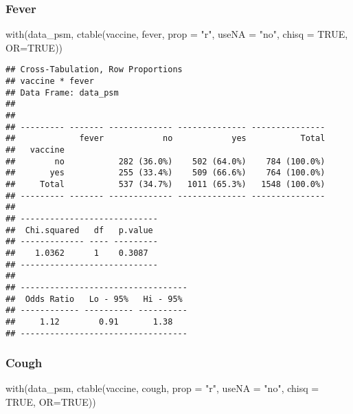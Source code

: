 \documentclass[
]{article}
\newenvironment{Shaded}{\begin{snugshade}}{\end{snugshade}}
\newcommand{\AttributeTok}[1]{\textcolor[rgb]{0.77,0.63,0.00}{#1}}
\newcommand{\ConstantTok}[1]{\textcolor[rgb]{0.00,0.00,0.00}{#1}}
\newcommand{\FunctionTok}[1]{\textcolor[rgb]{0.00,0.00,0.00}{#1}}
\newcommand{\NormalTok}[1]{#1}
\newcommand{\StringTok}[1]{\textcolor[rgb]{0.31,0.60,0.02}{#1}}
\begin{document}
\hypertarget{fever-1}{%
\subsubsection{Fever}\label{fever-1}}

\begin{Shaded}
\begin{Highlighting}[]
\FunctionTok{with}\NormalTok{(data\_psm, }\FunctionTok{ctable}\NormalTok{(vaccine, fever, }\AttributeTok{prop =} \StringTok{"r"}\NormalTok{, }\AttributeTok{useNA =} \StringTok{"no"}\NormalTok{, }\AttributeTok{chisq =} \ConstantTok{TRUE}\NormalTok{, }\AttributeTok{OR=}\ConstantTok{TRUE}\NormalTok{))}
\end{Highlighting}
\end{Shaded}

\begin{verbatim}
## Cross-Tabulation, Row Proportions  
## vaccine * fever  
## Data Frame: data_psm  
## 
## 
## --------- ------- ------------- -------------- ---------------
##             fever            no            yes           Total
##   vaccine                                                     
##        no           282 (36.0%)    502 (64.0%)    784 (100.0%)
##       yes           255 (33.4%)    509 (66.6%)    764 (100.0%)
##     Total           537 (34.7%)   1011 (65.3%)   1548 (100.0%)
## --------- ------- ------------- -------------- ---------------
## 
## ----------------------------
##  Chi.squared   df   p.value 
## ------------- ---- ---------
##    1.0362      1    0.3087  
## ----------------------------
## 
## ----------------------------------
##  Odds Ratio   Lo - 95%   Hi - 95% 
## ------------ ---------- ----------
##     1.12        0.91       1.38   
## ----------------------------------
\end{verbatim}

\hypertarget{cough-1}{%
\subsubsection{Cough}\label{cough-1}}

\begin{Shaded}
\begin{Highlighting}[]
\FunctionTok{with}\NormalTok{(data\_psm, }\FunctionTok{ctable}\NormalTok{(vaccine, cough, }\AttributeTok{prop =} \StringTok{"r"}\NormalTok{, }\AttributeTok{useNA =} \StringTok{"no"}\NormalTok{, }\AttributeTok{chisq =} \ConstantTok{TRUE}\NormalTok{, }\AttributeTok{OR=}\ConstantTok{TRUE}\NormalTok{))}
\end{Highlighting}
\end{Shaded}
\end{document}
